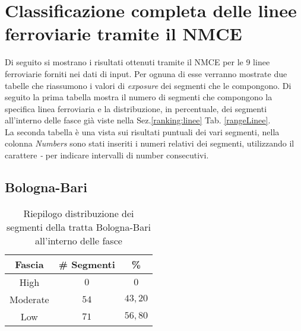 \newpage

\section{Classificazione completa delle linee ferroviarie tramite il NMCE}
Di seguito si mostrano i risultati ottenuti tramite il NMCE per le 9 linee ferroviarie forniti nei dati di input. Per ognuna di esse verranno mostrate due tabelle che riassumono i valori di \textit{exposure} dei segmenti  che le compongono.
Di seguito la prima tabella mostra il numero di segmenti che compongono la specifica linea ferroviaria e la distribuzione, in percentuale, dei segmenti all'interno delle fasce già viste  nella Sez.\ref{ranking:linee}  Tab. \ref{rangeLinee}.\\
La seconda tabella è una vista sui risultati puntuali dei vari segmenti, nella colonna \textit{Numbers} sono stati inseriti i numeri relativi dei segmenti, utilizzando il carattere \textit{-} per indicare intervalli di number consecutivi. 

\subsection{Bologna-Bari}
\label{app:bolognabari}
\begin{table}[h]
\centering
\begin{tabular}{|c|c|c|}
\hline \rowcolor{lightgray}
Fascia   & \# Segmenti & \%    \\ \hline \rowcolor{flamingopink}
High     & $0$           & $0$     \\ \hline \rowcolor{icterine}
Moderate & $54$          & $43,20$ \\ \hline \rowcolor{inchworm}
Low      & $71$          & $56,80$ \\ \hline
\end{tabular}
\caption{Riepilogo distribuzione dei segmenti della tratta Bologna-Bari all’interno delle fasce}
\label{}
\end{table}


